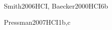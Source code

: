 \begin{syllabus}
\begin{unit}{\HCFoundationsDef}{Smith2006HCI, Baecker2000HCI}{6}{b}
    \begin{topics}%
	\item \HCFoundationsTopicMotivation%
	\item \HCFoundationsTopicGlossary%
	\item \HCFoundationsTopicContext%
	\item \HCFoundationsTopicProcess%
	\item \HCFoundationsTopicDifferent%
	\item \HCFoundationsTopicModels%
	\item \HCFoundationsTopicSocial%
	\item \HCFoundationsTopicAccommodating%
	\item \HCFoundationsTopicThe%
	\item \HCFoundationsTopicUser%
    \end{topics}%
    \begin{unitgoals}%
	\item \HCFoundationsObjONE%
	\item \HCFoundationsObjEIGHT%
	\item \HCFoundationsObjTWO%
	\item \HCFoundationsObjTHREE%
	\item \HCFoundationsObjFOUR%
	\item \HCFoundationsObjFIVE%
	\item \HCFoundationsObjNINE%
	\item \HCFoundationsObjSEVEN%
	\item \HCFoundationsObjSIX%
	\item \HCFoundationsObjONEOH%
    \end{unitgoals}%
\end{unit}

\begin{unit}{\PLObjectOrientedProgrammingDef}{Pressman2007HCI}{1}{b,c}
    \begin{topics}%
	 \item \PLObjectOrientedProgrammingTopicObject
	 \item \PLObjectOrientedProgrammingTopicUML
	 \item \PLObjectOrientedProgrammingTopicClasses
	 \item \PLObjectOrientedProgrammingTopicInheritance
	 \item \PLObjectOrientedProgrammingTopicClasshierarchies
	 \item \PLObjectOrientedProgrammingTopicCollection
    \end{topics}%
    \begin{unitgoals}%
	 \item \PLObjectOrientedProgrammingObjONE
	 \item \PLObjectOrientedProgrammingObjTWO
	 \item \PLObjectOrientedProgrammingObjFOUR
	 \item \PLObjectOrientedProgrammingObjSEVEN
    \end{unitgoals}%
\end{unit}


\end{syllabus}
